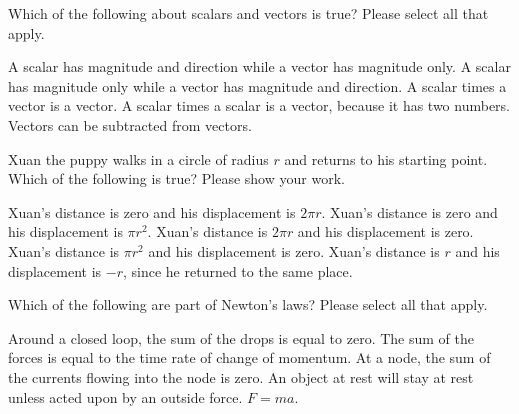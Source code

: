 \documentclass[exam,addpoints, noanswers]{exam}
\begin{document}
\begin{questions}
\question[5] Which of the following about scalars and vectors is true? Please select all that apply. 
\begin{choices}
\choice A scalar has magnitude and direction while a vector has magnitude only. 
\CorrectChoice A scalar has magnitude only while a vector has magnitude and direction. 
\CorrectChoice A scalar times a vector is a vector. 
\choice A scalar times a scalar is a vector, because it has two numbers. 
\CorrectChoice Vectors can be subtracted from vectors. 
\end{choices}



\question[5] Xuan the puppy walks in a circle of radius $r$ and returns to his starting point. Which of the following is true? Please show your work.
\begin{choices}
\choice Xuan's distance is zero and his displacement is $2\pi r$. 
\choice Xuan's distance is zero and his displacement is $\pi r^2$. 
\CorrectChoice Xuan's distance is $2\pi r$ and his displacement is zero. 
\choice Xuan's distance is $\pi r^2$ and his displacement is zero. 
\choice Xuan's distance is $r$ and his displacement is $-r$, since he returned to the same place. 
\end{choices}



\question[5] Which of the following are part of Newton's laws? Please select all that apply.  
\begin{choices}
\choice Around a closed loop, the sum of the drops is equal to zero. 
\CorrectChoice The sum of the forces is equal to the time rate of change of momentum. 
\choice At a node, the sum of the currents flowing into the node is zero. 
\CorrectChoice An object at rest will stay at rest unless acted upon by an outside force. 
\CorrectChoice $F=ma$. 
\end{choices}



\end{questions}
\end{document}
